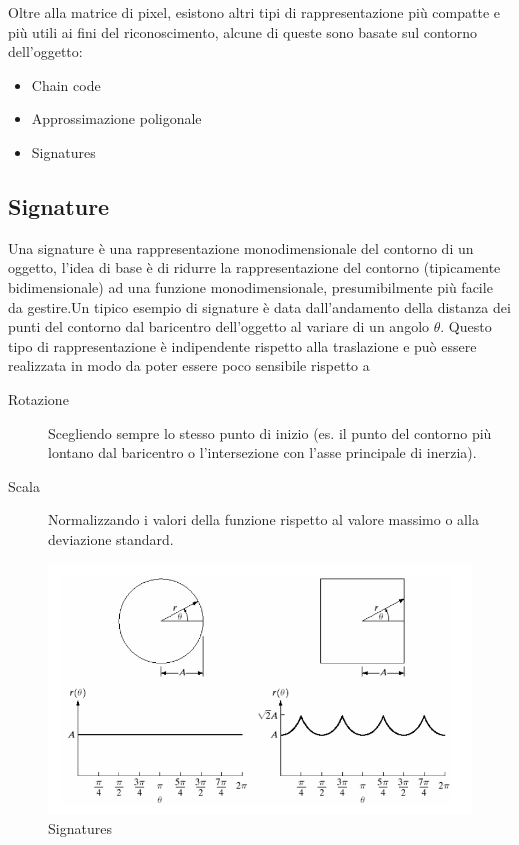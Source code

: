 Oltre alla matrice di pixel, esistono altri tipi di 
rappresentazione più compatte e più utili ai 
fini del riconoscimento, alcune di queste sono basate sul contorno 
dell'oggetto:
\begin{itemize}
\item Chain code
\item Approssimazione poligonale
\item Signatures
\end{itemize}

\subsection{Signature} Una signature è una rappresentazione  monodimensionale
del contorno di un oggetto, l'idea di base è di ridurre la  rappresentazione
del contorno (tipicamente  bidimensionale) ad una funzione  monodimensionale,
presumibilmente più  facile da gestire.Un tipico esempio di signature è data
dall'andamento della distanza dei punti del contorno  dal baricentro
dell'oggetto al variare di un angolo $\theta$. Questo tipo di rappresentazione
è indipendente rispetto alla traslazione e può  essere realizzata in modo da
poter essere  poco sensibile rispetto a

\begin{description}
\item[Rotazione]Scegliendo sempre lo stesso punto di inizio (es. il 
punto del contorno più lontano dal baricentro o 
l'intersezione con l'asse principale di inerzia).
\item[Scala]Normalizzando i valori della funzione rispetto al valore 
massimo o alla deviazione standard.
\end{description}

\begin{figure}[h]
\centering
\includegraphics[width=.8\textwidth]{img/signatures.png}
\caption{Signatures}
\label{fig:signatures}
\end{figure}

